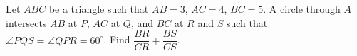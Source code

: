 Let $ABC$ be a triangle such that $AB=3$, $AC=4$, $BC=5$. A circle through $A$ intersects $AB$ at $P$, $AC$ at $Q$, and $BC$ at $R$ and $S$ such that $\angle PQS=\angle QPR=60^{\circ}$. Find $\dfrac{BR}{CR}+\dfrac{BS}{CS}$.
